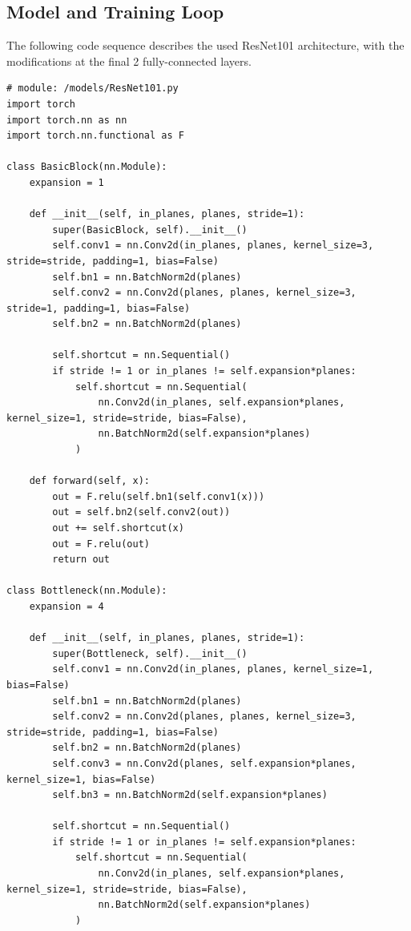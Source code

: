 \documentclass[a4paper, 12pt]{article}
\begin{document}
\subsection{Model and Training Loop}
The following code sequence describes the used ResNet101 architecture, with the modifications at the final 2 fully-connected layers.
\begin{lstlisting}
# module: /models/ResNet101.py
import torch
import torch.nn as nn
import torch.nn.functional as F

class BasicBlock(nn.Module):
    expansion = 1

    def __init__(self, in_planes, planes, stride=1):
        super(BasicBlock, self).__init__()
        self.conv1 = nn.Conv2d(in_planes, planes, kernel_size=3, stride=stride, padding=1, bias=False)
        self.bn1 = nn.BatchNorm2d(planes)
        self.conv2 = nn.Conv2d(planes, planes, kernel_size=3, stride=1, padding=1, bias=False)
        self.bn2 = nn.BatchNorm2d(planes)

        self.shortcut = nn.Sequential()
        if stride != 1 or in_planes != self.expansion*planes:
            self.shortcut = nn.Sequential(
                nn.Conv2d(in_planes, self.expansion*planes, kernel_size=1, stride=stride, bias=False),
                nn.BatchNorm2d(self.expansion*planes)
            )

    def forward(self, x):
        out = F.relu(self.bn1(self.conv1(x)))
        out = self.bn2(self.conv2(out))
        out += self.shortcut(x)
        out = F.relu(out)
        return out

class Bottleneck(nn.Module):
    expansion = 4

    def __init__(self, in_planes, planes, stride=1):
        super(Bottleneck, self).__init__()
        self.conv1 = nn.Conv2d(in_planes, planes, kernel_size=1, bias=False)
        self.bn1 = nn.BatchNorm2d(planes)
        self.conv2 = nn.Conv2d(planes, planes, kernel_size=3, stride=stride, padding=1, bias=False)
        self.bn2 = nn.BatchNorm2d(planes)
        self.conv3 = nn.Conv2d(planes, self.expansion*planes, kernel_size=1, bias=False)
        self.bn3 = nn.BatchNorm2d(self.expansion*planes)

        self.shortcut = nn.Sequential()
        if stride != 1 or in_planes != self.expansion*planes:
            self.shortcut = nn.Sequential(
                nn.Conv2d(in_planes, self.expansion*planes, kernel_size=1, stride=stride, bias=False),
                nn.BatchNorm2d(self.expansion*planes)
            )


\end{lstlisting}
\end{document}
